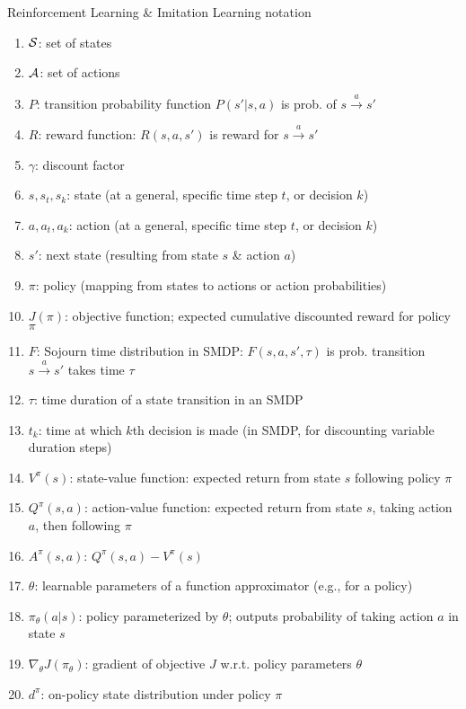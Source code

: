\documentclass{article}
\begin{document}
\begin{itemize}
    Reinforcement Learning \& Imitation Learning notation
    \begin{enumerate}
        \item ${\cal S}$: set of states
        \item ${\cal A}$: set of actions
        \item $P$: transition probability function $P(s'|s,a)$ is prob. of $s\xrightarrow{a}s'$
        \item $R$: reward function: $R(s,a,s')$ is reward for $s\xrightarrow{a}s'$
        \item $\gamma$: discount factor
        \item $s,s_t,s_k$: state (at a general, specific time step $t$, or decision $k$)
        \item $a,a_t,a_k$: action (at a general, specific time step $t$, or decision $k$)
        \item $s'$: next state (resulting from state $s$ \& action $a$)
        \item $\pi$: policy (mapping from states to actions or action probabilities)
        \item $J(\pi)$: objective function; expected cumulative discounted reward for policy $\pi$
        \item $F$: Sojourn time distribution in SMDP: $F(s,a,s',\tau)$ is prob. transition $s\xrightarrow{a}s'$ takes time $\tau$
        \item $\tau$: time duration of a state transition in an SMDP
        \item $t_k$: time at which $k$th decision is made (in SMDP, for discounting variable duration steps)
        \item $V^\pi(s)$: state-value function: expected return from state $s$ following policy $\pi$
        \item $Q^\pi(s,a)$: action-value function: expected return from state $s$, taking action $a$, then following $\pi$
        \item $A^\pi(s,a)$: $Q^\pi(s,a) - V^\pi(s)$
        \item $\theta$: learnable parameters of a function approximator (e.g., for a policy)
        \item $\pi_\theta(a|s)$: policy parameterized by $\theta$; outputs probability of taking action $a$ in state $s$
        \item $\nabla_\theta J(\pi_\theta)$: gradient of objective $J$ w.r.t. policy parameters $\theta$
        \item $d^\pi$: on-policy state distribution under policy $\pi$

\end{enumerate}
\end{itemize}
\end{document}
